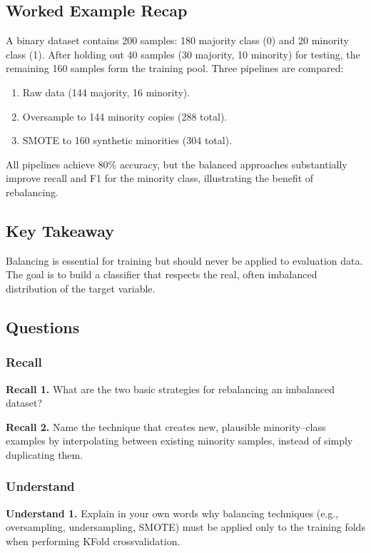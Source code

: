 \documentclass[12pt, a4paper]{article}
\begin{document}
\subsection{Worked Example Recap}
A binary dataset contains 200 samples: 180 majority class (0) and 20 minority class (1).  
After holding out 40 samples (30 majority, 10 minority) for testing, the remaining 160 samples form the training pool.  
Three pipelines are compared:
\begin{enumerate}
    \item Raw data (144 majority, 16 minority).
    \item Oversample to 144 minority copies (288 total).
    \item SMOTE to 160 synthetic minorities (304 total).
\end{enumerate}
All pipelines achieve 80\% accuracy, but the balanced approaches substantially improve recall and F1 for the minority class, illustrating the benefit of rebalancing.

\subsection{Key Takeaway}
Balancing is essential for training but should never be applied to evaluation data. The goal is to build a classifier that respects the real, often imbalanced distribution of the target variable.

\subsection{Questions}
\subsubsection{Recall}
\textbf{Recall 1.} What are the two basic strategies for rebalancing an imbalanced dataset?  

\textbf{Recall 2.} Name the technique that creates new, plausible minority--class examples by interpolating between existing minority samples, instead of simply duplicating them.  

\newpage
\subsubsection{Understand}
\textbf{Understand 1.} Explain in your own words why balancing techniques (e.g., oversampling, undersampling, SMOTE) must be applied only to the training folds when performing KFold crossvalidation.  
\end{document}
